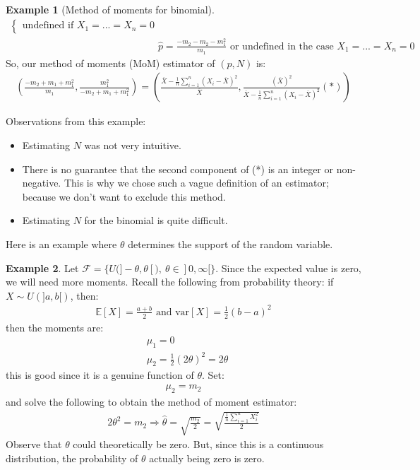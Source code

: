 \documentclass[11pt]{scrartcl}
\theoremstyle{definition}
\newtheorem{ex}{Example}
\theoremstyle{remark}
\newcommand{\dist}[0]{\mathcal{F}}
\newcommand{\EX}[1]{\mathbb{E}\left[#1 \right]}
\begin{document}
{\begin{ex}[Method of moments for binomial]
\begin{align*}
\begin{cases}
				\text{undefined if } X_1 = ... = X_n = 0 
		\end{cases}	 \\
		& \hat{p} = \frac{-m_2 - m_2 - m_1^2}{m_1} \text{ or undefined in the case } X_1 = ... = X_n = 0 
	\end{align*}
	So, our method of moments (MoM) estimator of $(p, N)$ is: 
	\begin{align*}
		\left( \frac{-m_2 + m_1 + m_1^2}{m_1} , \frac{m_1^2}{-m_2 + m_1 + m_1^2}  \right) = \left( \frac{\overline{X} - \frac{1}{n} \sum_{i=1}^n (X_i - \overline{X})^2}{\overline{X}} , \frac{(\overline{X})^2}{\overline{X} - \frac{1}{n} \sum_{i=1}^n (X_i - \overline{X})^2}  (*) \right) 	
	\end{align*}
\end{ex}
	Observations from this example: 
	\begin{itemize}[noitemsep]
		\item Estimating $N$ was not very intuitive. 
		\item There is no guarantee that the second component of (*) is an integer or non-negative. This is why we chose such a vague definition of an estimator; because we don't want to exclude this method. 
		\item Estimating $N$ for the binomial is quite difficult. 
	\end{itemize}
	
	Here is an example where $\theta$ determines the support of the random variable. 
	
\begin{ex} 
	Let $\dist = \{ U (]-\theta, \theta[),\ \theta \in ]0, \infty[ \}$. 	Since the expected value is zero, we will need more moments. Recall the following from probability theory: if $X \sim U(]a,b[)$, then: 
	\begin{align*}
		\EX{X} = \frac{a+b}{2} 	\text{ and } \text{var}[X] = \frac{1}{2} (b-a)^2
	\end{align*}
	then the moments are: 
	\begin{align*}
		& \mu_1 = 0 \\
		& \mu_2 = \frac{1}{2} (2 \theta)^2 = 2 \theta 	
	\end{align*}
	this is good since it is a genuine function of $\theta$. Set: 
	\begin{align*}
		\mu_2 = m_2	
	\end{align*}
	and solve the following to obtain the method of moment estimator: 
	\begin{align*}
		2 \theta^2 = m_2 \Rightarrow \hat{\theta} = \sqrt{\frac{m_2}{2}} = \sqrt{\frac{\frac{1}{n} \sum_{i=1}^n X_i^2}{2}}	
	\end{align*}
	Observe that $\theta$ could theoretically be zero. But, since this is a continuous distribution, the probability of $\theta$ actually being zero is zero. 
\end{ex}


}
\end{document}
